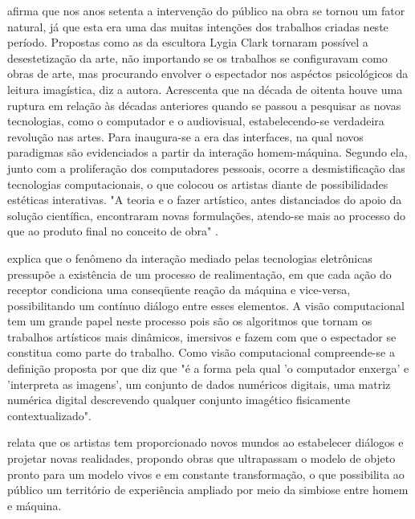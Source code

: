  afirma que nos anos setenta a intervenção do público na obra se tornou um fator natural, já que esta era uma das muitas intenções dos trabalhos criadas neste período. Propostas como as da escultora Lygia Clark tornaram possível a desestetização da arte, não importando se os trabalhos se configuravam como obras de arte, mas procurando envolver o espectador nos aspéctos psicológicos da leitura imagística, diz a autora. Acrescenta que na década de oitenta houve uma ruptura em relação às décadas anteriores quando se passou a pesquisar as novas tecnologias, como o computador e o audiovisual, estabelecendo-se verdadeira revolução nas artes. Para  inaugura-se a era das interfaces, na qual novos paradigmas são evidenciados a partir da interação homem-máquina. Segundo ela, junto com a proliferação dos computadores pessoais, ocorre a desmistificação das tecnologias computacionais, o que colocou os artistas diante de possibilidades estéticas interativas. "A teoria e o fazer artístico, antes distanciados do apoio da solução científica, encontraram novas formulações, atendo-se mais ao processo do que ao produto final no conceito de obra" \cite[p. 78]{rahde}.

 explica que o fenômeno da interação mediado pelas tecnologias eletrônicas pressupõe a existência de um processo de realimentação, em que cada ação do receptor condiciona uma conseqüente reação da máquina e vice-versa, possibilitando um contínuo diálogo entre esses elementos. A visão computacional tem um grande papel neste processo pois são os algoritmos que tornam os trabalhos artísticos mais dinâmicos, imersivos e fazem com que o espectador se constitua como parte do trabalho. Como visão computacional compreende-se a definição proposta por  que diz que "é a forma pela qual 'o computador enxerga' e 'interpreta as imagens', um conjunto de dados numéricos digitais, uma matriz numérica digital descrevendo qualquer conjunto imagético fisicamente contextualizado".

 relata que os artistas tem proporcionado novos mundos ao estabelecer diálogos e projetar novas realidades, propondo obras que ultrapassam o modelo de objeto pronto para um modelo vivos e em constante transformação, o que possibilita ao público um território de experiência ampliado por meio da simbiose entre homem e máquina.

